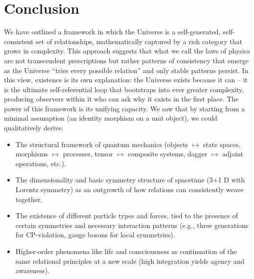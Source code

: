\documentclass{article}
\begin{document}
\section{Conclusion}

We have outlined a framework in which the Universe is a self-generated, self-consistent set of relationships, mathematically captured by a rich category that grows in complexity. This approach suggests that what we call the laws of physics are not transcendent prescriptions but rather patterns of consistency that emerge as the Universe “tries every possible relation” and only stable patterns persist. In this view, existence is its own explanation: the Universe exists because it can – it is the ultimate self-referential loop that bootstraps into ever greater complexity, producing observers within it who can ask why it exists in the first place. The power of this framework is its unifying capacity. We saw that by starting from a minimal assumption (an identity morphism on a unit object), we could qualitatively derive:

\begin{itemize}
\item The structural framework of quantum mechanics (objects $\mapsto$ state spaces, morphisms $\mapsto$ processes, tensor $\mapsto$ composite systems, dagger $\mapsto$ adjoint operations, etc.).
\item The dimensionality and basic symmetry structure of spacetime (3+1 D with Lorentz symmetry) as an outgrowth of how relations can consistently weave together\cite{tegmark1997}.
\item The existence of different particle types and forces, tied to the presence of certain symmetries and necessary interaction patterns (e.g., three generations for CP-violation\cite{kobayashi1973}, gauge bosons for local symmetries).
\item Higher-order phenomena like life and consciousness as continuation of the same relational principles at a new scale (high integration yields agency and awareness).
\end{itemize}
\end{document}
